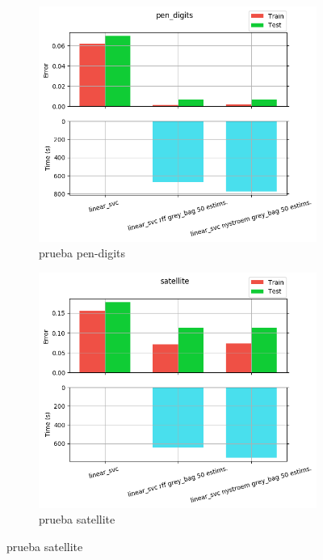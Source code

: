 \begin{figure}[ht]
  \centering
  \begin{subfigure}[b]{0.5\linewidth}
    \centering\captionsetup{width=.8\linewidth}\includegraphics[width=\imgscale\linewidth]{Figures/2_7/pen_digits}
    \caption{prueba pen-digits}
    \label{fig:2_7_pen_digits}
  \end{subfigure}%
  \begin{subfigure}[b]{0.5\linewidth}
    \centering\captionsetup{width=.8\linewidth}\includegraphics[width=\imgscale\linewidth]{Figures/2_7/satellite}
    \caption{prueba satellite}
    \label{fig:2_7_satellite}
  \end{subfigure}
\end{figure}

